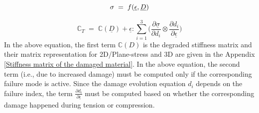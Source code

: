 \documentclass[12pt,a4paper,twoside,openright]{report}
\begin{document}
\begin{equation*}
\large{\sigma  \; = \; f(\underline{ \epsilon}, \underline{D} ) }
\end{equation*}

\begin{equation}
\mathbb{C}_{T}  \; = \; \mathbb{C}(\underline{D}) + \underline{ \epsilon}  : \sum_{i = 1}^{3}  \Big( \frac{\partial \underline{\sigma} }{\partial d_{i}} \otimes \frac{\partial d_{i}}{\partial \underline{ \epsilon} }\Big)
\label{Anisotropic tangent stiffness} 
\end{equation}
In the above equation, the first term $\mathbb{C}(D)$ is the degraded stiffness matrix and their matrix representation for 2D/Plane-stress and 3D are given in the Appendix \ref{Stiffness matrix of the damaged material}.  In the above equation, the second term (i.e., due to increased damage) must be computed only if the corresponding failure mode is active. Since the damage evolution equation $d_{i}$ depends on the failure index, the term $\frac{\partial d_{i}}{\partial \underline{ \epsilon} }$ must be computed based on whether the corresponding damage happened during tension or compression.
\end{document}
